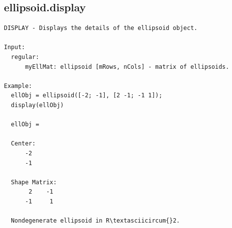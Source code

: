 \documentclass[letterpaper,10pt,english]{sphinxmanual}
\begin{document}
\subsection{ellipsoid.display}
\label{chap_functions:ellipsoid-display}
\begin{Verbatim}[commandchars=\\\{\}]
DISPLAY - Displays the details of the ellipsoid object.

Input:
  regular:
      myEllMat: ellipsoid [mRows, nCols] - matrix of ellipsoids.

Example:
  ellObj = ellipsoid([-2; -1], [2 -1; -1 1]);
  display(ellObj)

  ellObj =

  Center:
      -2
      -1

  Shape Matrix:
       2    -1
      -1     1

  Nondegenerate ellipsoid in R\textasciicircum{}2.
\end{Verbatim}
\end{document}
